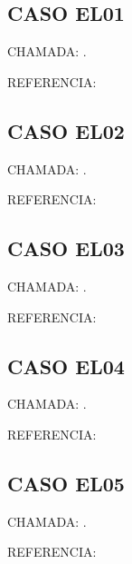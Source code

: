 \documentclass{undftex}
\begin{document}
\begin{refsection}\section*{CASO EL01}\noindent CHAMADA: . \textcite{v14}\par\noindent REFERENCIA:\par\printbibliography[heading=none,check=undfconsultadas]\end{refsection}\clearpage
\begin{refsection}\section*{CASO EL02}\noindent CHAMADA: . \textcite{loc02}\par\noindent REFERENCIA:\par\printbibliography[heading=none,check=undfconsultadas]\end{refsection}\clearpage
\begin{refsection}\section*{CASO EL03}\noindent CHAMADA: . \textcite{loc03}\par\noindent REFERENCIA:\par\printbibliography[heading=none,check=undfconsultadas]\end{refsection}\clearpage
\begin{refsection}\section*{CASO EL04}\noindent CHAMADA: . \textcite{loc04}\par\noindent REFERENCIA:\par\printbibliography[heading=none,check=undfconsultadas]\end{refsection}\clearpage
\begin{refsection}\section*{CASO EL05}\noindent CHAMADA: . \textcite{loc05}\par\noindent REFERENCIA:\par\printbibliography[heading=none,check=undfconsultadas]\end{refsection}\clearpage
\end{document}
